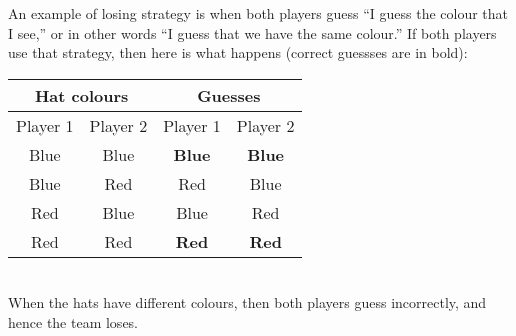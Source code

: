 \documentclass[a4paper, 11pt]{book}
\numberwithin{equation}{section}
\theoremstyle{plain}
\renewcommand{\(}{\ldbrack}
\renewcommand{\)}{\rdbrack}
\begin{document}
An example of losing strategy is when both players guess ``I guess the colour that I see,'' or in other words ``I guess that we have the same colour.'' If both players use that strategy, then here is what happens (correct guessses are in bold):
~\\
\begin{center}
\begin{tabular}{|c|c||c|c|}
	\hline
	\multicolumn{2}{|c||}{Hat colours} & \multicolumn{2}{|c|}{Guesses}\\
	\hline
	Player 1 & Player 2 & Player 1 & Player 2\\
	\hline
	Blue 	& Blue & \textbf{Blue} 	& \textbf{Blue} 	\\
	Blue 	& Red  & Red 			& Blue 	\\
	Red 	& Blue & Blue 			& Red 	\\
	Red 	& Red  & \textbf{Red} 	& \textbf{Red} 	\\
	\hline
\end{tabular}
\end{center}
~\\
When the hats have different colours, then both players guess incorrectly, and hence the team loses.
\end{document}
